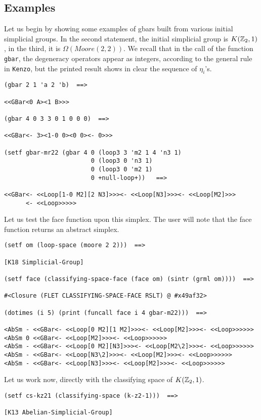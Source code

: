 \subsection* {Examples}

Let us begin by showing some examples of gbars built  from various
initial simplicial groups. In the second statement, the initial simplicial group
is $K({{\Bbb Z}}_2, 1)$, in the third, it is $\Omega({\mathit Moore}(2,2))$. We recall that
in the call of the function {\tt gbar}, the degeneracy operators appear as integers,
according to the general rule in {\tt Kenzo}, but the printed result shows in clear
the sequence of $\eta_i$'s.
{\footnotesize\begin{verbatim}
(gbar 2 1 'a 2 'b)  ==>

<<GBar<0 A><1 B>>>

(gbar 4 0 3 3 0 1 0 0 0)  ==>

<<GBar<- 3><1-0 0><0 0><- 0>>>

(setf gbar-mr22 (gbar 4 0 (loop3 3 'm2 1 4 'n3 1)
                        0 (loop3 0 'n3 1)
                        0 (loop3 0 'm2 1)
                        0 +null-loop+))   ==>

<<GBar<- <<Loop[1-0 M2][2 N3]>>><- <<Loop[N3]>>><- <<Loop[M2]>>>
      <- <<Loop>>>>>
\end{verbatim}}
Let us test the face function upon this simplex. The user will note
that the face function returns an abstract simplex.
{\footnotesize\begin{verbatim}
(setf om (loop-space (moore 2 2)))  ==>

[K18 Simplicial-Group]

(setf face (classifying-space-face (face om) (sintr (grml om))))  ==>

#<Closure (FLET CLASSIFYING-SPACE-FACE RSLT) @ #x49af32>

(dotimes (i 5) (print (funcall face i 4 gbar-m22)))  ==>

<AbSm - <<GBar<- <<Loop[0 M2][1 M2]>>><- <<Loop[M2]>>><- <<Loop>>>>>> 
<AbSm 0 <<GBar<- <<Loop[M2]>>><- <<Loop>>>>>> 
<AbSm - <<GBar<- <<Loop[0 M2][N3]>>><- <<Loop[M2\2]>>><- <<Loop>>>>>> 
<AbSm - <<GBar<- <<Loop[N3\2]>>><- <<Loop[M2]>>><- <<Loop>>>>>> 
<AbSm - <<GBar<- <<Loop[N3]>>><- <<Loop[M2]>>><- <<Loop>>>>>> 
\end{verbatim}}
Let us work now, directly with the classifying space of $K({{\Bbb Z}}_2, 1)$.
{\footnotesize\begin{verbatim}
(setf cs-kz21 (classifying-space (k-z2-1)))  ==>

[K13 Abelian-Simplicial-Group]
\end{verbatim}}
